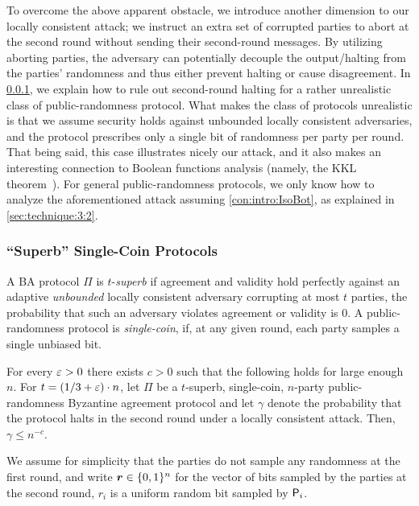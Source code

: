 To overcome the above apparent obstacle, we introduce another dimension to our locally consistent attack; we instruct an extra set of corrupted parties to abort at the second round without sending their second-round messages. By utilizing aborting parties, the adversary can potentially decouple the output/halting from the parties' randomness and thus either prevent halting or cause disagreement.
In \cref{sec:technique:3:1}, we explain how to rule out second-round halting for a rather unrealistic class of public-randomness protocol. What makes the class of protocols unrealistic is that we assume security holds against unbounded locally consistent adversaries, and the protocol prescribes only a single bit of randomness per party per round. That being said, this case illustrates nicely our attack, and it also makes an interesting connection to Boolean functions analysis (namely, the KKL theorem~\cite{KKL88}). For general public-randomness protocols, we only know how to analyze the aforementioned attack assuming \cref{con:intro:IsoBot}, as explained in \cref{sec:technique:3:2}.

\subsubsection{``Superb'' Single-Coin Protocols}\label{sec:technique:3:1}
A BA protocol $\Pi$ is $t$-\emph{superb} if agreement and validity hold perfectly against an adaptive \emph{unbounded} locally consistent adversary corrupting at most $t$ parties, \ie the probability that such an adversary violates agreement or validity is $0$. A public-randomness protocol is \emph{single-coin}, if, at any given round, each party samples a single unbiased bit.

\begin{theorem}\label{bound:KKL}
For every $\varepsilon> 0$ there exists $c>0$ such that the following holds for large enough $n$. For $t=(1/3+\varepsilon) \cdot n$, let $\Pi$ be a $t$-superb, single-coin, $n$-party public-randomness Byzantine agreement protocol and let $\gamma$ denote the probability that the protocol halts in the second round under a locally consistent attack. Then, $\gamma\le n^{-c}$.
\end{theorem}

We assume for simplicity that the parties do not sample any randomness at the first round, and write ${ \boldsymbol{r}}\in {\{0,1\}^n}$ for the vector of bits sampled by the parties at the second round, \ie $r_i$ is a uniform random bit sampled by $\mathsf{P}_i$.




